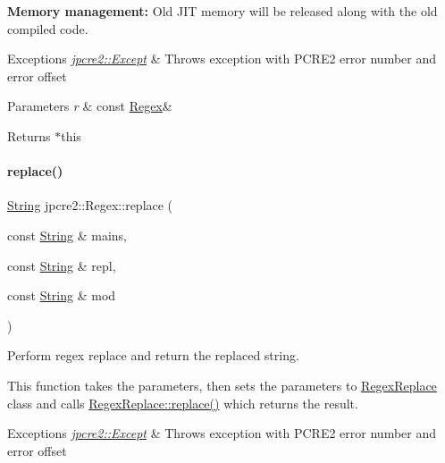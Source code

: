 {\bfseries Memory management\+:} Old J\+IT memory will be released along with the old compiled code. 
\begin{DoxyExceptions}{Exceptions}
{\em \hyperlink{classjpcre2_1_1Except}{jpcre2\+::\+Except}} & Throws exception with P\+C\+R\+E2 error number and error offset \\
\hline
\end{DoxyExceptions}

\begin{DoxyParams}{Parameters}
{\em r} & const \hyperlink{classjpcre2_1_1Regex}{Regex}\& \\
\hline
\end{DoxyParams}
\begin{DoxyReturn}{Returns}
$\ast$this 
\end{DoxyReturn}
\hypertarget{classjpcre2_1_1Regex_ac592ce7a5e4210ed5f90a0105b1f2981_ac592ce7a5e4210ed5f90a0105b1f2981}{}\label{classjpcre2_1_1Regex_ac592ce7a5e4210ed5f90a0105b1f2981_ac592ce7a5e4210ed5f90a0105b1f2981} 
\paragraph{\texorpdfstring{replace()}{replace()}\hspace{0.1cm}{\footnotesize\ttfamily [1/2]}}
{\footnotesize\ttfamily \hyperlink{namespacejpcre2_a91f03070152fb228bc116c5a737f1d16}{String} jpcre2\+::\+Regex\+::replace (\begin{DoxyParamCaption}\item[{const \hyperlink{namespacejpcre2_a91f03070152fb228bc116c5a737f1d16}{String} \&}]{mains,  }\item[{const \hyperlink{namespacejpcre2_a91f03070152fb228bc116c5a737f1d16}{String} \&}]{repl,  }\item[{const \hyperlink{namespacejpcre2_a91f03070152fb228bc116c5a737f1d16}{String} \&}]{mod }\end{DoxyParamCaption})\hspace{0.3cm}{\ttfamily [inline]}}



Perform regex replace and return the replaced string. 

This function takes the parameters, then sets the parameters to \hyperlink{classjpcre2_1_1RegexReplace}{Regex\+Replace} class and calls \hyperlink{classjpcre2_1_1RegexReplace_afd087fa7a9bfedec802d1a3dd7edbdd0_afd087fa7a9bfedec802d1a3dd7edbdd0}{Regex\+Replace\+::replace()} which returns the result. 
\begin{DoxyExceptions}{Exceptions}
{\em \hyperlink{classjpcre2_1_1Except}{jpcre2\+::\+Except}} & Throws exception with P\+C\+R\+E2 error number and error offset \\
\hline
\end{DoxyExceptions}

